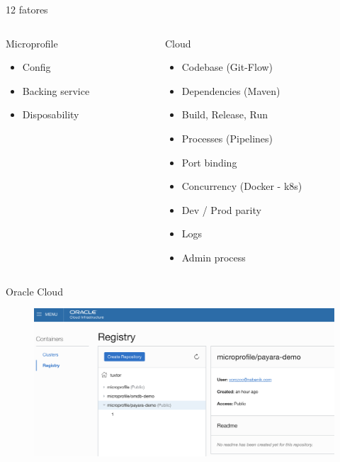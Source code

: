 \documentclass{beamer}
\begin{document}
\begin{frame}{12 fatores}

\begin{columns}[T] %
	
	\begin{column}[T]{4cm} %
		\begin{alertblock}{Microprofile}
	\begin{itemize}
		\item Config
		\item Backing service
		\item Disposability
	\end{itemize}
\end{alertblock}
	\end{column}
	\begin{column}[T]{6cm} %
		\begin{block}{Cloud}
	\begin{itemize}
	\item Codebase (Git-Flow)
	\item Dependencies (Maven)
	\item Build, Release, Run
	\item Processes (Pipelines)
	\item Port binding
	\item Concurrency (Docker - k8s)
	\item Dev / Prod parity
	\item Logs
	\item Admin process
\end{itemize}
\end{block}
	\end{column}
\end{columns}

\end{frame}

\begin{frame}{Oracle Cloud}
\begin{figure}
	\centering
	\includegraphics[width=0.95\linewidth]{Images/oc1}
\end{figure}
\end{frame}
\end{document}
